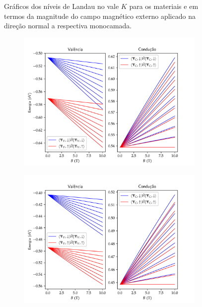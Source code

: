 \begin{figure}[p]
\begin{subfigure}{\textwidth}
    \caption{}
    \label{fig:crse2_k_valley_landau_levels}
  \end{subfigure}
  \caption{
    Gráficos dos níveis de Landau no vale $K$ para os materiais
      e
      em termos da magnitude
    do campo magnético externo aplicado na direção normal a respectiva
    monocamada.
  }
  \label{fig:k_valley_landau_levels}
\end{figure}

\begin{figure}[p]
  \centering
  \begin{subfigure}{\textwidth}
    \includegraphics[trim=0 0.28cm 0 0.9cm,clip,width=\textwidth]{imagens/crs2_k_prime_valley_landau_levels.png}
    \caption{}
    \label{fig:crs2_k_prime_valley_landau_levels}
  \end{subfigure}
  \begin{subfigure}{\textwidth}
    \includegraphics[trim=0 0.28cm 0 0.9cm,clip,width=\textwidth]{imagens/crse2_k_prime_valley_landau_levels.png}

\end{subfigure}
\end{figure}
